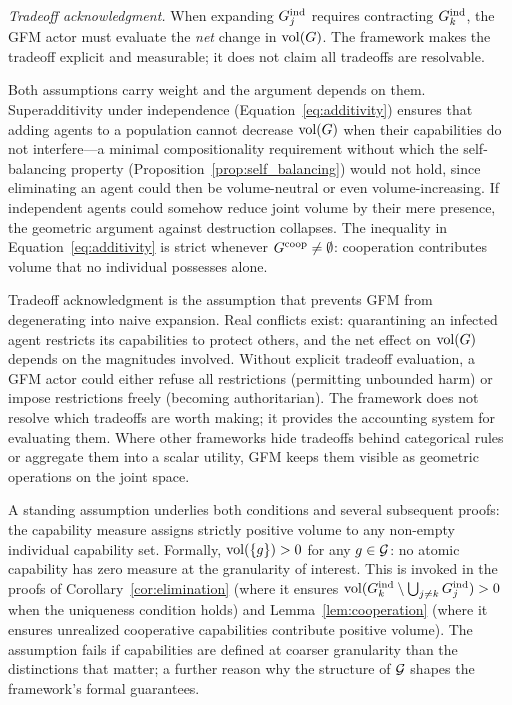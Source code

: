\emph{Tradeoff acknowledgment.} When expanding $G_{j}^{\mathrm{ind}}$ requires contracting $G_{k}^{\mathrm{ind}}$, the GFM actor must evaluate the \emph{net} change in $\operatorname{vol}(G)$. The framework makes the tradeoff explicit and measurable; it does not claim all tradeoffs are resolvable.

Both assumptions carry weight and the argument depends on them. Superadditivity
under independence (Equation~\ref{eq:additivity}) ensures that adding agents to
a population cannot decrease $\operatorname{vol}(G)$ when their capabilities do not
interfere---a minimal compositionality requirement without which the
self-balancing property (Proposition~\ref{prop:self_balancing}) would not hold,
since eliminating an agent could then be volume-neutral or even
volume-increasing. If independent agents could somehow reduce joint volume by
their mere presence, the geometric argument against destruction collapses. The
inequality in Equation~\eqref{eq:additivity} is strict whenever $G^{\mathrm{coop}} \neq
\emptyset$: cooperation contributes volume that no individual possesses alone.

Tradeoff acknowledgment is the assumption that prevents GFM from degenerating
into naive expansion. Real conflicts exist: quarantining an infected agent
restricts its capabilities to protect others, and the net effect on $\operatorname{vol}(G)$
depends on the magnitudes involved. Without explicit tradeoff evaluation, a GFM
actor could either refuse all restrictions (permitting unbounded harm) or
impose restrictions freely (becoming authoritarian). The framework does not
resolve which tradeoffs are worth making; it provides the accounting system for
evaluating them. Where other frameworks hide tradeoffs behind categorical rules
or aggregate them into a scalar utility, GFM keeps them visible as geometric
operations on the joint space.

A standing assumption underlies both conditions and several subsequent proofs:
the capability measure assigns strictly positive volume to any non-empty
individual capability set. Formally, $\operatorname{vol}(\{g\}) > 0$ for any $g \in \mathcal{G}$: no
atomic capability has zero measure at the granularity of interest. This is
invoked in the proofs of Corollary~\ref{cor:elimination} (where it ensures
$\operatorname{vol}(G_{k}^{\mathrm{ind}} \setminus \bigcup_{j \neq k} G_{j}^{\mathrm{ind}}) > 0$ when the uniqueness
condition holds) and Lemma~\ref{lem:cooperation} (where it ensures unrealized
cooperative capabilities contribute positive volume). The assumption fails if
capabilities are defined at coarser granularity than the distinctions that
matter; a further reason why the structure of $\mathcal{G}$ shapes the framework's
formal guarantees.

